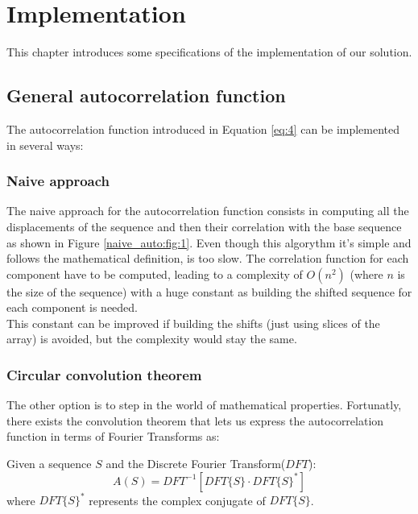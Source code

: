 \chapter{Implementation}
  This chapter introduces some specifications of the implementation
  of our solution.\\


  \section{General autocorrelation function}
    The autocorrelation function introduced in Equation \eqref{eq:4} can be
    implemented in several ways:

      \subsection{Naive approach}
        The naive approach for the autocorrelation function consists in
        computing all the displacements of the sequence and then
        their correlation with the base sequence as shown in Figure
        \ref{naive_auto:fig:1}. Even though this algorythm it's simple and
        follows the mathematical definition, is too slow. The correlation function
        for each component have to be computed, leading to a
        complexity of $O(n^{2})$ (where $n$ is the size of the sequence) with a
        huge constant as building the shifted sequence for each
        component is needed.\\

        This constant can be improved if building the shifts (just
        using slices of the array) is avoided, but the complexity would stay the
        same.

      \subsection{Circular convolution theorem}
        The other option is to step in the world of mathematical properties.
        Fortunatly, there exists the convolution theorem\cite{golomb_ref} that
        lets us express the autocorrelation function in terms of Fourier
        Transforms as:
        \begin{theorem}
          Given a sequence $S$ and the Discrete Fourier Transform($DFT$):
          \begin{equation}
            A(S) = DFT^{-1}[DFT\{S\} · DFT\{S\}^{*}]
          \end{equation}
          where $DFT\{S\}^{*}$ represents the complex conjugate of $DFT\{S\}$.
        \end{theorem}


